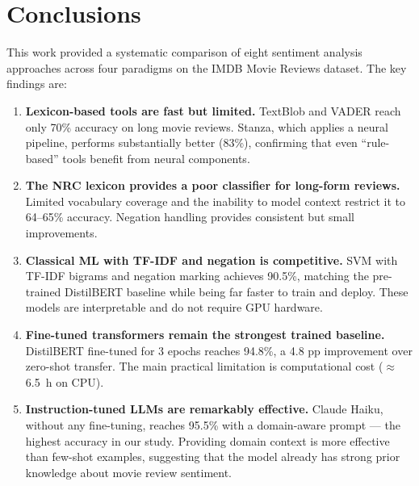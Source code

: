 \documentclass[12pt,reqno,twoside]{amsbook}
\theoremstyle{plain}
\numberwithin{equation}{chapter}
\numberwithin{section}{chapter}
\begin{document}
\chapter{Conclusions}\label{ch:conclusions}

\noindent This work provided a systematic comparison of eight sentiment analysis
approaches across four paradigms on the IMDB Movie Reviews dataset.
The key findings are:

\begin{enumerate}[noitemsep]
  \item \textbf{Lexicon-based tools are fast but limited.}
        TextBlob and VADER reach only 70\% accuracy on long movie reviews.
        Stanza, which applies a neural pipeline, performs substantially better
        (83\%), confirming that even ``rule-based'' tools benefit from neural
        components.

  \item \textbf{The NRC lexicon provides a poor classifier for long-form reviews.}
        Limited vocabulary coverage and the inability to model context restrict
        it to 64--65\% accuracy.
        Negation handling provides consistent but small improvements.

  \item \textbf{Classical ML with TF-IDF and negation is competitive.}
        SVM with TF-IDF bigrams and negation marking achieves 90.5\%, matching
        the pre-trained DistilBERT baseline while being far faster to train and
        deploy.
        These models are interpretable and do not require GPU hardware.

  \item \textbf{Fine-tuned transformers remain the strongest trained baseline.}
        DistilBERT fine-tuned for 3 epochs reaches 94.8\%, a 4.8 pp improvement
        over zero-shot transfer.
        The main practical limitation is computational cost ($\approx$6.5~h on CPU).

  \item \textbf{Instruction-tuned LLMs are remarkably effective.}
        Claude Haiku, without any fine-tuning, reaches 95.5\% with a domain-aware
        prompt --- the highest accuracy in our study.
        Providing domain context is more effective than few-shot examples,
        suggesting that the model already has strong prior knowledge about movie
        review sentiment.
\end{enumerate}
\end{document}
